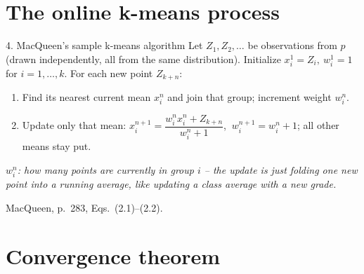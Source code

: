 \documentclass[10pt,compress]{beamer}
\newcommand{\defline}[1]{{\footnotesize\textcolor{aggiemaroon}{\textit{#1}}\par}}
\begin{document}
\section[Online process]{The online k-means process}

\begin{frame}{4. MacQueen's sample k-means algorithm}
Let $Z_1,Z_2,\ldots$ be observations from $p$ (drawn independently, all from the same distribution). Initialize $x_i^1=Z_i,\ w_i^1=1$ for $i=1,\ldots,k$. For each new point $Z_{k+n}$:
\begin{enumerate}\small
\item Find its nearest current mean $x_i^n$ and join that group; increment weight $w_i^n$.
\item Update only that mean: $x_i^{n+1}=\dfrac{w_i^n x_i^n+Z_{k+n}}{w_i^n+1}$, $\ w_i^{n+1}=w_i^n+1$; all other means stay put.
\end{enumerate}
\defline{$w_i^n$: how many points are currently in group $i$ -- the update is just folding one new point into a running average, like updating a class average with a new grade.}
\begin{center}
\end{center}
\vfill
{\scriptsize MacQueen, p.~283, Eqs.~(2.1)--(2.2).}
\end{frame}

\section[Convergence]{Convergence theorem}
\end{document}
